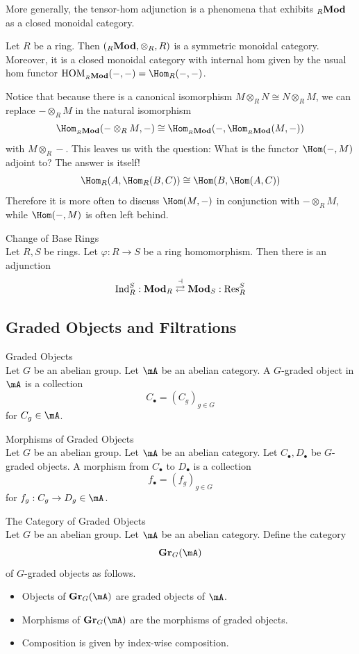 \documentclass[a4paper]{article}
\begin{document}
More generally, the tensor-hom adjunction is a phenomena that exhibits ${_R}\bold{Mod}$  as a closed monoidal category. 

\begin{prp}{}{} Let $R$ be a ring. Then $({_R}\bold{Mod},\otimes_R,R)$ is a symmetric monoidal category. Moreover, it is a closed monoidal category with internal hom given by the usual hom functor $\text{HOM}_{{_R}\bold{Mod}}(-,-)=\Hom_R(-,-)$. 
\end{prp}

Notice that because there is a canonical isomorphism $M\otimes_RN\cong N\otimes_RM$, we can replace $-\otimes_RM$ in the natural isomorphism $$\Hom_{_R\bold{Mod}}(-\otimes_RM,-)\cong\Hom_{_R\bold{Mod}}(-,\Hom_{_R\bold{Mod}}(M,-))$$ with $M\otimes_R-$. This leaves us with the question: What is the functor $\Hom(-,M)$ adjoint to? The answer is itself! $$\Hom_R(A,\Hom_R(B,C))\cong\Hom(B,\Hom(A,C))$$ Therefore it is more often to discuss $\Hom(M,-)$ in conjunction with $-\otimes_RM$, while $\Hom(-,M)$ is often left behind. 

\begin{thm}{Change of Base Rings}{}\\
Let $R,S$ be rings. Let $\varphi:R\to S$ be a ring homomorphism. Then there is an adjunction $$\text{Ind}_R^S:\bold{Mod}_R\overset{\dashv}{\rightleftarrows}\bold{Mod}_S:\text{Res}_R^S$$
\end{thm}

\subsection{Graded Objects and Filtrations}
\begin{defn}{Graded Objects}{}\\
Let $G$ be an abelian group. Let $\mA$ be an abelian category. A $G$-graded object in $\mA$ is a collection $$C_\bullet=(C_g)_{g\in G}$$ for $C_g\in\mA$. 
\end{defn}

\begin{defn}{Morphisms of Graded Objects}{}\\
Let $G$ be an abelian group. Let $\mA$ be an abelian category. Let $C_\bullet,D_\bullet$ be $G$-graded objects. A morphism from $C_\bullet$ to $D_\bullet$ is a collection $$f_\bullet=(f_g)_{g\in G}$$ for $f_g:C_g\to D_g\in\mA$. 
\end{defn}

\begin{defn}{The Category of Graded Objects}{}\\
Let $G$ be an abelian group. Let $\mA$ be an abelian category. Define the category $$\bold{Gr}_G(\mA)$$ of $G$-graded objects as follows. 
\begin{itemize}
\item Objects of $\bold{Gr}_G(\mA)$ are graded objects of $\mA$. 
\item Morphisms of $\bold{Gr}_G(\mA)$ are the morphisms of graded objects. 
\item Composition is given by index-wise composition. 
\end{itemize}
\end{defn}
\end{document}
